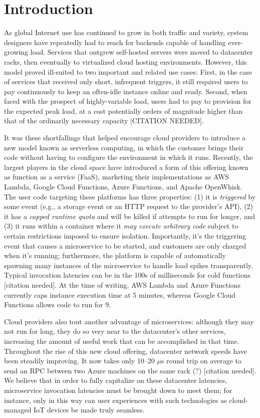 \section{Introduction}
\label{sec:intro}

As global Internet use has continued to grow in both traffic and variety, system designers have repeatedly had to reach for backends capable of handling ever-growing load.
Services that outgrew self-hosted servers were moved to datacenter racks, then eventually to virtualized cloud hosting environments.
However, this model proved ill-suited to two important and related use cases:
First, in the case of services that received only short, infrequent triggers, it still required users to pay continuously to keep an often-idle instance online and ready.
Second, when faced with the prospect of highly-variable load, users had to pay to provision for the expected peak load, at a cost potentially orders of magnitude higher than that of the ordinarily necessary capacity [CITATION NEEDED].

It was these shortfallings that helped encourage cloud providers to introduce a new model known as serverless computing, in which the customer brings their code without having to configure the environment in which it runs.
Recently, the largest players in the cloud space have introduced a form of this offering known as function as a service (FaaS), marketing their implementations as AWS Lambda, Google Cloud Functions, Azure Functions, and Apache OpenWhisk.
The user code targeting these platforms has three properties: (1) it is \textit{triggered} by some event (e.g., a storage event or an HTTP request to the provider's API), (2) it has a \textit{capped runtime quota} and will be killed if attempts to run for longer, and (3) it runs within a container where it \textit{may execute arbitrary code} subject to certain restrictions imposed to ensure isolation.
Importantly, it's the triggering event that causes a microservice to be started, and customers are only charged when it's running; furthermore, the platform is capable of automatically spawning many instances of the microservice to handle load spikes transparently.
Typical invocation latencies can be in the 100s of milliseconds for cold functions [citation needed].
At the time of writing, AWS Lambda and Azure Functions currently caps instance execution time at 5 minutes, whereas Google Cloud Functions allows code to run for 9.

Cloud providers also tout another advantage of microservices: although they may not run for long, they do so very near to the datacenter's other services, increasing the amount of useful work that can be accomplished in that time.
Throughout the rise of this new cloud offering, datacenter network speeds have been steadily improving.
It now takes only 10--20 $\mu$s round trip on average to send an RPC between two Azure machines on the same rack (?) [citation needed].
We believe that in order to fully capitalize on these datacenter latencies, microservice invocation latencies must be brought down to meet them; for instance, only in this way can user experiences with such technologies as cloud-managed IoT devices be made truly seamless.

